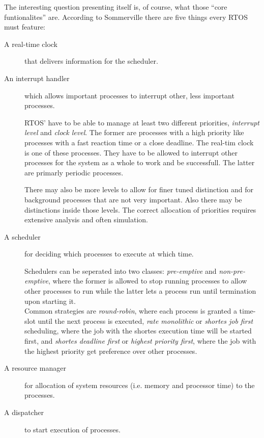 \documentclass[10pt,a4paper,titlepage,draft]{article} %
\begin{document}
The interesting question presenting itself is, of course, what those ``core funtionalites'' are.
According to Sommerville there are five things every RTOS must feature:
\begin{description}
	\item[A real-time clock] that delivers information for the scheduler.
	\item[An interrupt handler] which allows important processes to interrupt other, less important processes.

	RTOS' have to be able to manage at least two different priorities, \emph{interrupt level} and \emph{clock level}.
	The former are processes with a high priority like processes with a fast reaction time or a close deadline.
	The real-tim clock is one of these processes.
	They have to be allowed to interrupt other processes for the system as a whole to work and be successfull.
	The latter are primarly periodic processes.

	There may also be more levels to allow for finer tuned distinction and for background processes that are not very important. Also there may be distinctions inside those levels. The correct allocation of priorities requires extensive analysis and often simulation.
	\item[A scheduler] for deciding which processes to execute at which time.

	Schedulers can be seperated into two classes: \emph{pre-emptive} and \emph{non-pre-emptive}, where the former is allowed to stop running processes to allow other processes to run while the latter lets a process run until termination upon starting it.\\
	Common strategies are \emph{round-robin}, where each process is granted a time-slot until the next process is executed, \emph{rate monolithic} or \emph{shortes job first} scheduling, where the job with the shortes execution time will be started first, and \emph{shortes deadline first} or \emph{highest priority first}, where the job with the highest priority get preference over other processes.
	\item[A resource manager] for allocation of system resources (i.e. memory and processor time) to the processes.
	\item[A dispatcher] to start execution of processes.
\end{description}

\end{document}
